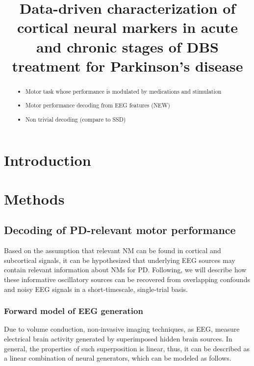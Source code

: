 \documentclass[10pt,a4paper]{article}
\title{Data-driven characterization of cortical neural markers in acute and chronic stages of DBS treatment for Parkinson's disease}
\begin{document}
\maketitle
\listoftodos

\begin{abstract}

\begin{itemize}
\item Motor task whose performance is modulated by medications and stimulation
\item Motor performance decoding from EEG features (NEW)
\item Non trivial decoding (compare to SSD)
\end{itemize}
\end{abstract}

\section{Introduction}
\section{Methods}
\subsection{Decoding of PD-relevant motor performance}

Based on the assumption that relevant NM can be found in cortical and subcortical signals, it can be hypothesized that underlying EEG sources may contain relevant information about NMs for PD.  Following, we will describe how these informative oscillatory sources can be recovered from overlapping confounds and noisy EEG signals in a short-timescale, single-trial basis. 

\subsubsection{Forward model of EEG generation}
\label{par:modeling}
Due to volume conduction, non-invasive imaging techniques, as EEG, measure electrical brain activity generated by superimposed hidden brain sources. In general, the properties of such superposition is linear, thus, it can be described as a linear combination of neural generators, which can be modeled as follows.
\end{document}
